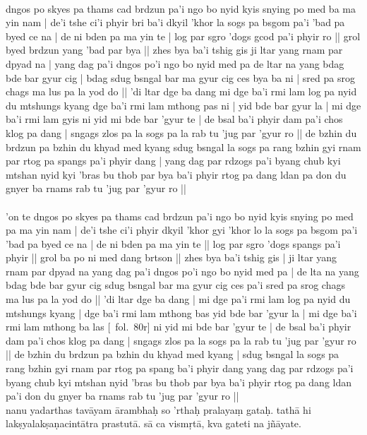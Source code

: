 \documentclass[12pt]{article}
\begin{document}
\textbf{\TVA}\\
dngos po skyes pa thams cad brdzun pa'i ngo bo nyid kyis snying po med ba ma yin nam | de'i tshe ci'i phyir bri ba'i dkyil 'khor la sogs pa bsgom pa'i 'bad pa byed ce na | de ni bden pa ma yin te | log par sgro 'dogs gcod pa'i phyir ro || grol byed brdzun yang 'bad par bya || zhes bya ba'i tshig gis ji ltar yang rnam par dpyad na | yang dag pa'i dngos po'i ngo bo nyid med pa de ltar na yang bdag bde bar gyur cig | bdag sdug bsngal bar ma gyur cig ces bya ba ni | sred pa srog chags ma lus pa la yod do || 'di ltar dge ba dang mi dge ba'i rmi lam log pa nyid du mtshungs kyang dge ba'i rmi lam mthong pas ni | yid bde bar gyur la | mi dge ba'i rmi lam gyis ni yid mi bde bar 'gyur te | de bsal ba'i phyir dam pa'i chos klog pa dang | sngags zlos pa la sogs pa la rab tu 'jug par 'gyur ro || de bzhin du brdzun pa bzhin du khyad med kyang sdug bsngal la sogs pa rang bzhin gyi rnam par rtog pa spangs pa'i phyir dang | yang dag par rdzogs pa'i byang chub kyi mtshan nyid kyi 'bras bu thob par bya ba'i phyir rtog pa dang ldan pa don du gnyer ba rnams rab tu 'jug par 'gyur ro || \\

\textbf{\TVB}\\
'on te dngos po skyes pa thams cad brdzun pa'i ngo bo nyid kyis snying po med pa ma yin nam | de'i tshe ci'i phyir dkyil 'khor gyi 'khor lo la sogs pa bsgom pa'i 'bad pa byed ce na | de ni bden pa ma yin te || log par sgro 'dogs spangs pa'i phyir || grol ba po ni med dang brtson || zhes bya ba'i tshig gis | ji ltar yang rnam par dpyad na yang dag pa'i dngos po'i ngo bo nyid med pa | de lta na yang bdag bde bar gyur cig sdug bsngal bar ma gyur cig ces pa'i sred pa srog chags ma lus pa la yod do || 'di ltar dge ba dang | mi dge pa'i rmi lam log pa nyid du mtshungs kyang | dge ba'i rmi lam mthong bas yid bde bar 'gyur la | mi dge ba'i rmi lam mthong ba las [\TVB\ fol.\ 80r] ni yid mi bde bar 'gyur te | de bsal ba'i phyir dam pa'i chos klog pa dang | sngags zlos pa la sogs pa la rab tu 'jug par 'gyur ro || de bzhin du brdzun pa bzhin du khyad med kyang | sdug bsngal la sogs pa rang bzhin gyi rnam par rtog pa spang ba'i phyir dang yang dag par rdzogs pa'i byang chub kyi mtshan nyid 'bras bu thob par bya ba'i phyir rtog pa dang ldan pa'i don du gnyer ba rnams rab tu 'jug par 'gyur ro || \\

nanu yadarthas tavāyam\footnoteB{
	yadarthas tavāyam] \conj ; yadarthasvā'yaṃ \MS ; yadarthatvād ayaṃ \EDD 
} ārambhaḥ so 'rthaḥ pralayaṃ gataḥ. tathā hi lakṣyalakṣaṇacintātra prastutā. sā ca vismṛtā, kva gateti na jñāyate.\\
\end{document}
